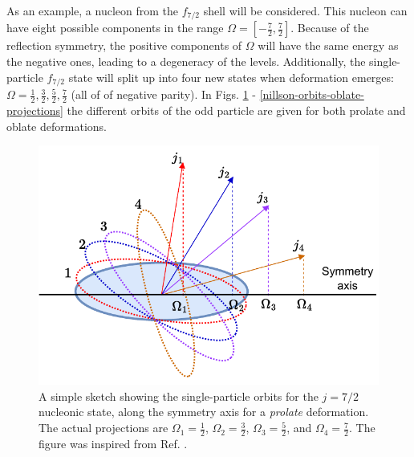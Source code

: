 As an example, a nucleon from the $f_{7/2}$ shell will be considered. This nucleon can have eight possible components in the range $\Omega=[-\frac{7}{2},\frac{7}{2}]$. Because of the reflection symmetry, the positive components of $\Omega$ will have the same energy as the negative ones, leading to a degeneracy of the levels. Additionally, the single-particle $f_{7/2}$ state will split up into four new states when deformation emerges: $\Omega=\frac{1}{2},\frac{3}{2},\frac{5}{2},\frac{7}{2}$ (all of of negative parity). In Figs. \ref{nillson-orbits-prolate-projections} - \ref{nillson-orbits-oblate-projections} the different orbits of the odd particle are given for both prolate and oblate deformations.
\begin{figure}
    \centering
    \includegraphics[scale=1]{Chapters/Figures/nillson_SP_orbits.pdf}
    \caption{A simple sketch showing the single-particle orbits for the $j=7/2$ nucleonic state, along the symmetry axis for a \emph{prolate} deformation. The actual projections are $\Omega_1=\frac{1}{2}$, $\Omega_2=\frac{3}{2}$, $\Omega_3=\frac{5}{2}$, and $\Omega_4=\frac{7}{2}$. The figure was inspired from Ref. \cite{krane1991introductory}.}
    \label{nillson-orbits-prolate-projections}
\end{figure}
